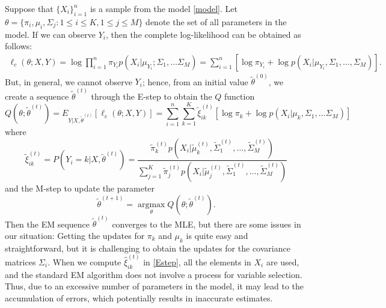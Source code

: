 \documentclass[11pt]{article}
\newcommand{\amax}{\operatorname*{argmax}}
\newcommand{\wh}{\widehat}
\newcommand{\wt}{\widetilde}
\begin{document}
Suppose that $\{X_i\}_{i=1}^n$ is a sample from the model \eqref{model}. Let $\theta=\{\pi_i, \mu_i, \Sigma_j: 1\le i \le K, 1\le j \le M\}$ denote the set of all parameters in the model.
If we can observe $Y_i$, then the complete log-likelihood can be obtained as follows:
\begin{align*}
  \ell_c (\theta;X,Y) = \log \prod_{i=1}^n \pi_{Y_i} p(X_i|\mu_{Y_i};\Sigma_1,\dots \Sigma_M)=  \sum_{i=1}^n [\log\pi_{Y_i}+ \log p(X_i| \mu_{Y_i}, \Sigma_1,\dots , \Sigma_M)].
\end{align*}
But, in general, we cannot observe $Y_i$; hence, from an initial value $\wt\theta^{(0)}$, we create a sequence $\wt\theta^{(t)}$ through the E-step to obtain the $Q$ function
\begin{equation*}
 Q(\theta; \wt\theta^{(t)}) = E_{Y|X,\wt\theta^{(t)}}[\ell_c(\theta;X,Y)] = \sum_{i=1}^n \sum_{k=1}^K \wt \xi_{ik}^{(t)} [ \log \pi_k + \log p(X_i | \mu_k , \Sigma_1,\dots \Sigma_M)]
\end{equation*}
where
\begin{equation}\label{Estep}
  \wt\xi _{ik}^{(t)} = P(Y_i=k| X,\wt\theta^{(t)}) = \frac{\wt\pi_k^{(t)} p(X_i|\wt \mu_k^{(t)}, \wt\Sigma_1^{(t)},  \dots, \wt \Sigma_M^{(t)})}{\sum_{j=1}^K \wt\pi_j^{(t)} p(X_i | \wt\mu_j^{(t)}, \wt\Sigma_1^{(t)}, \dots, \wt\Sigma_M^{(t)})}
\end{equation}
and the M-step to update the parameter
\begin{equation*}
	\wt\theta^{(t+1)} = \amax_\theta Q(\theta; \wt\theta^{(t)}).
\end{equation*}
Then the EM sequence $\wt\theta^{(t)}$ converges to the MLE, but there are some issues in our situation:
Getting the updates for $\pi_k$ and $\mu_k$ is quite easy and straightforward, but it is challenging to obtain the updates for the covariance matrices $\Sigma_i$.
When we compute $\wh\xi^{(t)}_{ik}$ in \eqref{Estep}, all the elements in $X_i$ are used, and the standard EM algorithm does not involve a process for variable selection.
Thus, due to an excessive number of parameters in the model, it may lead to the accumulation of errors, which potentially results in inaccurate estimates.
\end{document}
